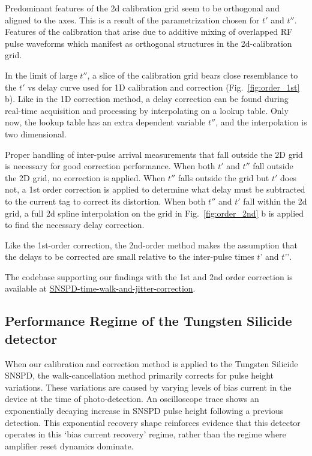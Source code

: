 \documentclass[11pt]{caltech_thesis} %
\begin{document}
Predominant features of the 2d calibration grid seem to be orthogonal and aligned to the axes. This is a result of the parametrization chosen for $t'$ and $t''$. Features of the calibration that arise due to additive mixing of overlapped RF pulse waveforms which manifest as orthogonal structures in the 2d-calibration grid.

In the limit of large $t''$, a slice of the calibration grid bears close resemblance to the $t'$ vs delay curve used for 1D calibration and correction (Fig.~\ref{fig:order_1st} b). Like in the 1D correction method, a delay correction can be found during real-time acquisition and processing by interpolating on a lookup table. Only now, the lookup table has an extra dependent variable $t''$, and the interpolation is two dimensional.

Proper handling of inter-pulse arrival measurements that fall outside the 2D grid is necessary for good correction performance. When both $t'$ and $t''$ fall outside the 2D grid, no correction is applied. When $t''$ falls outside the grid but $t'$ does not, a 1st order correction is applied to determine what delay must be subtracted to the current tag to correct its distortion. When both $t''$ and $t'$ fall within the 2d grid, a full 2d spline interpolation on the grid in Fig.~\ref{fig:order_2nd} b is applied to find the necessary delay correction.

Like the 1st-order correction, the 2nd-order method makes the assumption that the delays to be corrected are small relative to the inter-pulse times $t’$ and $t’’$.

The codebase supporting our findings with the 1st and 2nd order correction is
available at \href{https://github.com/sansseriff/SNSPD-time-walk-and-jitter-correction}{SNSPD-time-walk-and-jitter-correction}.

{}

\hypertarget{performance-regime-of-the-tungsten-silicide-detector}{%
\subsection{Performance Regime of the Tungsten Silicide detector}\label{performance-regime-of-the-tungsten-silicide-detector}}

When our calibration and correction method is applied to the Tungsten Silicide SNSPD, the walk-cancellation method primarily corrects for pulse height variations. These variations are caused by varying levels of bias current in the device at the time of photo-detection. An oscilloscope trace shows an exponentially decaying increase in SNSPD pulse height following a previous detection. This exponential recovery shape reinforces evidence that this detector operates in this `bias current recovery' regime, rather than the regime where amplifier reset dynamics dominate.
\end{document}
